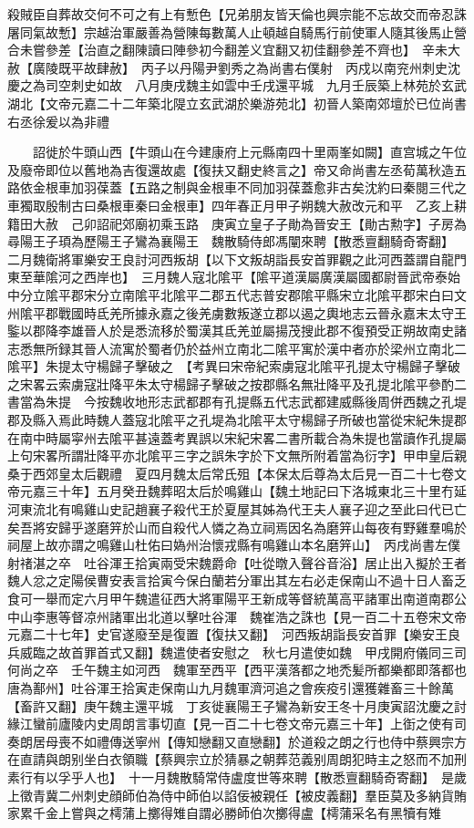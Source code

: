 殺賊臣自葬故交何不可之有上有慙色【兄弟朋友皆天倫也興宗能不忘故交而帝忍誅屠同氣故慙】宗越治軍嚴善為營陳每數萬人止頓越自騎馬行前使軍人隨其後馬止營合未嘗參差【治直之翻陳讀曰陣參初今翻差义宜翻又初佳翻參差不齊也】　辛未大赦【廣陵既平故肆赦】　丙子以丹陽尹劉秀之為尚書右僕射　丙戍以南兖州刺史沈慶之為司空刺史如故　八月庚戌魏主如雲中壬戌還平城　九月壬辰築上林苑於玄武湖北【文帝元嘉二十二年築北隄立玄武湖於樂游苑北】初晉人築南郊壇於已位尚書右丞徐爰以為非禮

　　詔徙於牛頭山西【牛頭山在今建康府上元縣南四十里兩峯如闕】直宫城之午位及廢帝即位以舊地為吉復還故處【復扶又翻史終言之】帝又命尚書左丞荀萬秋造五路依金根車加羽葆蓋【五路之制與金根車不同加羽葆蓋愈非古矣沈約曰秦閱三代之車獨取殷制古曰桑根車秦曰金根車】四年春正月甲子朔魏大赦改元和平　乙亥上耕籍田大赦　己卯詔祀郊廟初乘玉路　庚寅立皇子子勛為晉安王【勛古勲字】子房為尋陽王子頊為歷陽王子鸞為襄陽王　魏散騎侍郎馮闡來聘【散悉亶翻騎奇寄翻】　二月魏衛將軍樂安王良討河西叛胡【以下文叛胡詣長安首罪觀之此河西蓋謂自龍門東至華隂河之西岸也】　三月魏人寇北隂平【隂平道漢屬廣漢屬國都尉晉武帝泰始中分立隂平郡宋分立南隂平北隂平二郡五代志普安郡隂平縣宋立北隂平郡宋白曰文州隂平郡戰國時氐羌所據永嘉之後羌虜數叛遂立郡以遏之輿地志云晉永嘉末太守王鍳以郡降李雄晉人於是悉流移於蜀漢其氐羌並屬揚茂搜此郡不復預受正朔故南史諸志悉無所録其晉人流寓於蜀者仍於益州立南北二隂平寓於漢中者亦於梁州立南北二隂平】朱提太守楊歸子擊破之　【考異曰宋帝紀索虜寇北隂平孔提太守楊歸子擊破之宋畧云索虜寇壯降平朱太守楊歸子擊破之按郡縣名無壯降平及孔提北隂平參酌二書當為朱提　今按魏收地形志武都郡有孔提縣五代志武都建威縣後周併西魏之孔堤郡及縣入焉此時魏人蓋寇北隂平之孔堤為北隂平太守楊歸子所破也當從宋紀朱提郡在南中時屬寜州去隂平甚遠蓋考異誤以宋紀宋畧二書所載合為朱提也當讀作孔提屬上句宋畧所謂壯降平亦北隂平三字之誤朱字於下文無所附着當為衍字】甲申皇后親桑于西郊皇太后觀禮　夏四月魏太后常氏殂【本保太后尊為太后見一百二十七卷文帝元嘉三十年】五月癸丑魏葬昭太后於鳴雞山【魏土地記曰下洛城東北三十里冇延河東流北有鳴雞山史記趙襄子殺代王於夏屋其姊為代王夫人襄子迎之至此曰代已亡矣吾將安歸乎遂磨笄於山而自殺代人憐之為立祠焉因名為磨笄山每夜有野雞羣鳴於祠屋上故亦謂之鳴雞山杜佑曰媯州治懷戎縣有鳴雞山本名磨笄山】　丙戌尚書左僕射禇湛之卒　吐谷渾王拾寅兩受宋魏爵命【吐從暾入聲谷音浴】居止出入擬於王者魏人忿之定陽侯曹安表言拾寅今保白蘭若分軍出其左右必走保南山不過十日人畜乏食可一舉而定六月甲午魏遣征西大將軍陽平王新成等督統萬高平諸軍出南道南郡公中山李惠等督凉州諸軍出北道以擊吐谷渾　魏崔浩之誅也【見一百二十五卷宋文帝元嘉二十七年】史官遂廢至是復置【復扶又翻】　河西叛胡詣長安首罪【樂安王良兵威臨之故首罪首式又翻】魏遣使者安慰之　秋七月遣使如魏　甲戌開府儀同三司何尚之卒　壬午魏主如河西　魏軍至西平【西平漢落都之地禿髪所都樂都即落都也唐為鄯州】吐谷渾王拾寅走保南山九月魏軍濟河追之會疾疫引還獲雜畜三十餘萬【畜許又翻】庚午魏主還平城　丁亥徙襄陽王子鸞為新安王冬十月庚寅詔沈慶之討緣江蠻前廬陵内史周朗言事切直【見一百二十七卷文帝元嘉三十年】上衘之使有司奏朗居母喪不如禮傳送寧州【傳知戀翻又直戀翻】於道殺之朗之行也侍中蔡興宗方在直請與朗别坐白衣領職【蔡興宗立於猜暴之朝葬范義别周朗犯時主之怒而不加刑素行有以孚乎人也】　十一月魏散騎常侍盧度世等來聘【散悉亶翻騎奇寄翻】　是歲上徵青冀二州刺史顔師伯為侍中師伯以諂佞被親任【被皮義翻】羣臣莫及多納貨賄家累千金上嘗與之樗蒲上擲得雉自謂必勝師伯次擲得盧【樗蒲采名有黑犢有雉